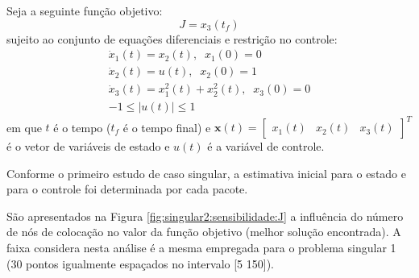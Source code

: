 \label{sec:singular2}


Seja a seguinte função objetivo:
%
\begin{equation}
	\label{eq:singular2:J}
	J = x_3(t_f)
\end{equation}
%
sujeito ao conjunto de equações diferenciais e restrição no controle:
%
\begin{equation}
	\label{eq:singular2:dinamica}
	\begin{gathered}
		\dot{x}_1(t) = x_2(t),\;\;x_1(0) = 0 \\
		\dot{x}_2(t) = u(t),\;\;x_2(0) = 1 \\
		\dot{x}_3(t) = x_1^2(t) + x_2^2(t),\;\;x_3(0) = 0\\
		-1 \leq |u(t)| \leq 1
	\end{gathered}
\end{equation}
%
em que $t$ é o tempo ($t_f$ é o tempo final) e $ \mathbf{x}(t) = \begin{bmatrix} x_1(t) & x_2(t) & x_3(t) \end{bmatrix}^T $ é o vetor de variáveis de estado e $ u(t) $ é a variável de controle. 

Conforme o primeiro estudo de caso singular, a estimativa inicial para o estado e para o controle foi determinada por cada pacote. 


São apresentados na Figura \ref{fig:singular2:sensibilidade:J} a influência do número de nós de colocação no valor da função objetivo (melhor solução encontrada). A faixa considera nesta análise é a mesma empregada para o problema singular 1 (30 pontos igualmente espaçados no intervalo [5 150]).

